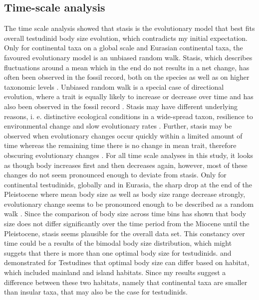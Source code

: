 
\subsection{Time-scale analysis}

The time scale analysis showed that stasis is the evolutionary model that best fits overall testudinid body size evolution, which contradicts my initial expectation.
Only for continental taxa on a global scale and Eurasian continental taxa, the favoured evolutionary model is an unbiased random walk.
Stasis, which describes fluctuations around a mean which in the end do not results in a net change, has often been observed in the fossil record, both on the species as well as on higher taxonomic levels \citep{Smith2016,Hunt2006,Pimiento2015, Hunt2015}. 
Unbiased random walk is a special case of directional evolution, where a trait is equally likely to increase or decrease over time \citep{Hunt2004} and has also been observed in the fossil record \citep{Hunt2006,Smith2016,Hunt2004}.
Stasis may have different underlying reasons, i. e. distinctive ecological conditions in a wide-spread taxon, resilience to environmental change and slow evolutionary rates \citep{Pimiento2015,Hunt2015,Sheldon1996,Benton2001}.
Further, stasis may be observed when evolutionary changes occur quickly within a limited amount of time whereas the remaining time there is no change in mean trait, therefore obscuring evolutionary changes \citep{Hunt2004}.
For all time scale analyses in this study, it looks as though body increases first and then decreases again, however, most of these changes do not seem pronounced enough to deviate from stasis. Only for continental testudinids, globally and in Eurasia, the sharp drop at the end of the Pleistocene where mean body size as well as body size range decrease strongly, evolutionary change seems to be pronounced enough to be described as a random walk \citep{Hunt2004, Hunt2015}.
Since the comparison of body size across time bins has shown that body size does not differ significantly over the time period from the Miocene until the Pleistocene, stasis seems plausible for the overall data set.
This constancy over time could be a results of the bimodal body size distribution, which might suggets that there is more than one optimal body size for testudinids. \cite{Angielczyk2015} and \cite{Jaffe2011a} demonstrated for Testudines that optimal body size can differ based on habitat, which included mainland and island habitats. Since my results suggest a difference between these two habitats, namely that continental taxa are smaller than insular taxa, that may also be the case for testudinids. 
